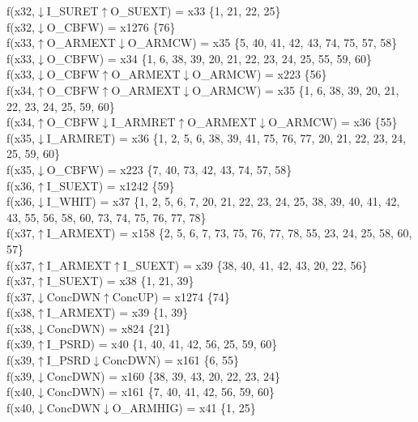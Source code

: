 f(x32,$\downarrow$I\_SURET$\uparrow$O\_SUEXT) = x33 \{1, 21, 22, 25\} \\  
f(x32,$\downarrow$O\_CBFW) = x1276 \{76\} \\  
f(x33,$\uparrow$O\_ARMEXT$\downarrow$O\_ARMCW) = x35 \{5, 40, 41, 42, 43, 74, 75, 57, 58\} \\  
f(x33,$\downarrow$O\_CBFW) = x34 \{1, 6, 38, 39, 20, 21, 22, 23, 24, 25, 55, 59, 60\} \\  
f(x33,$\downarrow$O\_CBFW$\uparrow$O\_ARMEXT$\downarrow$O\_ARMCW) = x223 \{56\} \\  
f(x34,$\uparrow$O\_CBFW$\uparrow$O\_ARMEXT$\downarrow$O\_ARMCW) = x35 \{1, 6, 38, 39, 20, 21, 22, 23, 24, 25, 59, 60\} \\  
f(x34,$\uparrow$O\_CBFW$\downarrow$I\_ARMRET$\uparrow$O\_ARMEXT$\downarrow$O\_ARMCW) = x36 \{55\} \\  
f(x35,$\downarrow$I\_ARMRET) = x36 \{1, 2, 5, 6, 38, 39, 41, 75, 76, 77, 20, 21, 22, 23, 24, 25, 59, 60\} \\  
f(x35,$\downarrow$O\_CBFW) = x223 \{7, 40, 73, 42, 43, 74, 57, 58\} \\  
f(x36,$\uparrow$I\_SUEXT) = x1242 \{59\} \\  
f(x36,$\downarrow$I\_WHIT) = x37 \{1, 2, 5, 6, 7, 20, 21, 22, 23, 24, 25, 38, 39, 40, 41, 42, 43, 55, 56, 58, 60, 73, 74, 75, 76, 77, 78\} \\  
f(x37,$\uparrow$I\_ARMEXT) = x158 \{2, 5, 6, 7, 73, 75, 76, 77, 78, 55, 23, 24, 25, 58, 60, 57\} \\  
f(x37,$\uparrow$I\_ARMEXT$\uparrow$I\_SUEXT) = x39 \{38, 40, 41, 42, 43, 20, 22, 56\} \\  
f(x37,$\uparrow$I\_SUEXT) = x38 \{1, 21, 39\} \\  
f(x37,$\downarrow$ConcDWN$\uparrow$ConcUP) = x1274 \{74\} \\  
f(x38,$\uparrow$I\_ARMEXT) = x39 \{1, 39\} \\  
f(x38,$\downarrow$ConcDWN) = x824 \{21\} \\  
f(x39,$\uparrow$I\_PSRD) = x40 \{1, 40, 41, 42, 56, 25, 59, 60\} \\  
f(x39,$\uparrow$I\_PSRD$\downarrow$ConcDWN) = x161 \{6, 55\} \\  
f(x39,$\downarrow$ConcDWN) = x160 \{38, 39, 43, 20, 22, 23, 24\} \\  
f(x40,$\downarrow$ConcDWN) = x161 \{7, 40, 41, 42, 56, 59, 60\} \\  
f(x40,$\downarrow$ConcDWN$\downarrow$O\_ARMHIG) = x41 \{1, 25\} \\  
